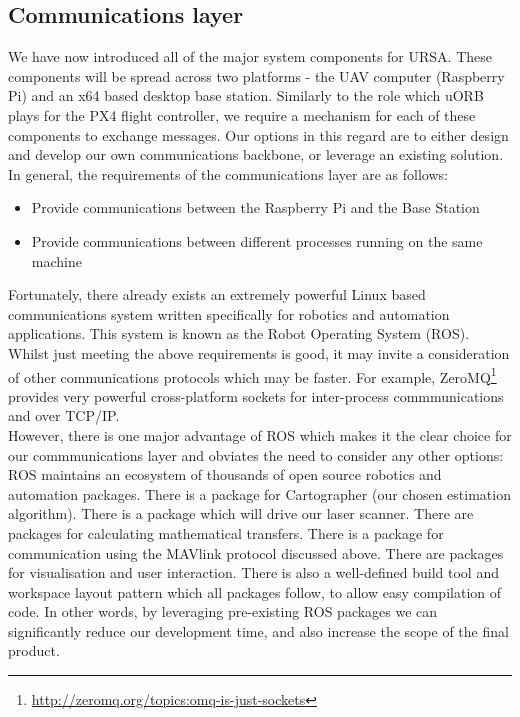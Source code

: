 \documentclass[capstone_report.tex]{subfiles}
\begin{document}
    \subsection{Communications layer}\label{subsec:comm_layer}
    We have now introduced all of the major system components for URSA. These components will be spread across two platforms - the UAV computer (Raspberry Pi) and an x64 based desktop base station. Similarly to the role which uORB plays for the PX4 flight controller, we require a mechanism for each of these components to exchange messages. Our options in this regard are to either design and develop our own communications backbone, or leverage an existing solution. In general, the requirements of the communications layer are as follows:

    \begin{itemize}
    	\item Provide communications between the Raspberry Pi and the Base Station
    	\item Provide communications between different processes running on the same machine 
    \end{itemize}

    Fortunately, there already exists an extremely powerful Linux based communications system written specifically for robotics and automation applications. This system is known as the Robot Operating System (ROS). Whilst just meeting the above requirements is good, it may invite a consideration of other communications protocols which may be faster. For example, ZeroMQ\footnote{\url{http://zeromq.org/topics:omq-is-just-sockets}} provides very powerful cross-platform sockets for inter-process commmunications and over TCP/IP. \\

    However, there is one major advantage of ROS which makes it the clear choice for our commmunications layer and obviates the need to consider any other options: ROS maintains an ecosystem of thousands of open source robotics and automation packages. There is a package for Cartographer (our chosen estimation algorithm). There is a package which will drive our laser scanner. There are packages for calculating mathematical transfers. There is a package for communication using the MAVlink protocol discussed above. There are packages for visualisation and user interaction. There is also a well-defined build tool and workspace layout pattern which all packages follow, to allow easy compilation of code. In other words, by leveraging pre-existing ROS packages we can significantly reduce our development time, and also increase the scope of the final product. \\
\end{document}
